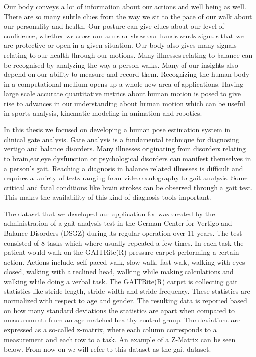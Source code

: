 Our body conveys a lot of information about our actions and well being as well. There are so many subtle clues from the way we sit to the pace of our walk about our personality and health. Our posture can give clues about our level of confidence, whether we cross our arms or show our hands sends signals that we are protective or open in a given situation. Our body also gives many signals relating to our health through our motions. Many illnesses relating to balance can be recognised by analyzing the way a person walks. Many of our insights also depend on our ability to measure and record them. Recognizing the human body in a computational medium opens up a whole new area of applications. Having large scale accurate quantitative metrics about human motion is posed to give rise to advances in our understanding about human motion which can be useful in sports analysis, kinematic modeling in animation and robotics. 

In this thesis we focused on developing a human pose estimation system in clinical gate analysis. Gate analysis is a fundamental technique for diagnosing vertigo and balance disorders. Many illnesses originating from disorders relating to brain,ear,eye dysfunction or psychological disorders can manifest themselves in a person's gait. Reaching a diagnosis in balance related illnesses is difficult and requires a variety of tests ranging from video oculography to gait analysis. Some critical and fatal conditions like brain strokes can be observed through a gait test. This makes the availability of this kind of diagnosis tools important.

The dataset that we developed our application for was created by the administration of a gait analysis test in the German Center for Vertigo and Balance Disorders (DSGZ) during its regular operation over 11 years. The test consisted of 8 tasks which where usually repeated a few times. In each task the patient would walk on the GAITRite(R) pressure carpet performing a certain action. Actions include, self-paced walk, slow walk, fast walk, walking with eyes closed, walking with a reclined head, walking while making calculations and walking while doing a verbal task. The GAITRite(R) carpet is collecting gait statistics like stride length, stride width and stride frequency. These statistics are normalized with respect to age and gender. The resulting data is reported based on how many standard deviations the statistics are apart when compared to measurements from an age-matched healthy control group. The deviations are expressed as a so-called z-matrix, where each column corresponds to a measurement and each row to a task. An example of a Z-Matrix can be seen below. From now on we will refer to this dataset as the gait dataset.

